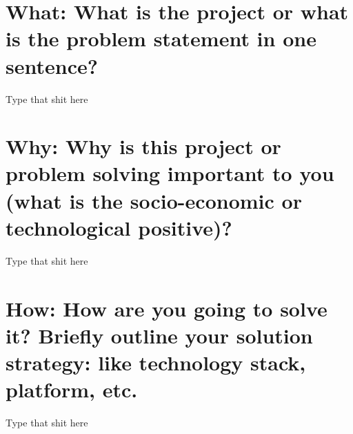 \section*{What: What is the project or what is the problem statement in one sentence?}
\doublespacing


Type that shit here


\singlespacing
\section*{Why: Why is this project or problem solving important to you (what is the socio-economic or technological positive)?}
\doublespacing


Type that shit here


\singlespacing
\section*{How: How are you going to solve it? Briefly outline your solution strategy: like technology stack, platform, etc.}
\doublespacing


Type that shit here